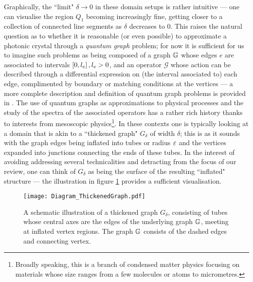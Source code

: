 Graphically, the ``limit" $\delta\rightarrow0$ in these domain setups is rather intuitive --- one can visualise the region $Q_1$ becoming increasingly fine, getting closer to a collection of connected line segments as $\delta$ decreases to 0.
This raises the natural question as to whether it is reasonable (or even possible) to approximate a photonic crystal through a \emph{quantum graph} problem; for now it is sufficient for us to imagine such problems as being composed of a graph $\mathbb{G}$ whose edges $e$ are associated to intervals $\left[ 0,l_{e} \right], l_{e}>0$, and an operator $\mathcal{G}$ whose action can be described through a differential expression on (the interval associated to) each edge, complimented by boundary or matching conditions at the vertices --- a more complete description and definition of quantum graph problems is provided in .
The use of quantum graphs as approximations to physical processes and the study of the spectra of the associated operators has a rather rich history thanks  to interests from mesoscopic physics\footnote{Broadly speaking, this is a branch of condensed matter physics focusing on materials whose size ranges from a few molecules or atoms to micrometres.}.
In these contexts one is typically looking at a domain that is akin to a ``thickened graph" $G_{\delta}$ of width $\delta$; this is as it sounds with the graph edges being inflated into tubes or radius $\varepsilon$ and the vertices expanded into junctions connecting the ends of these tubes.
In the interest of avoiding addressing several technicalities and detracting from the focus of our review, one can think of $G_{\delta}$ as being the surface of the resulting ``inflated" structure --- the illustration in figure \ref{fig:Diagram_ThickenedGraph} provides a sufficient visualisation.
\begin{figure}[b]
	\centering
	\texttt{[image: Diagram\_ThickenedGraph.pdf]}
	\caption{\label{fig:Diagram_ThickenedGraph} A schematic illustration of a thickened graph $G_{\delta}$, consisting of tubes whose central axes are the edges of the underlying graph $\mathbb{G}$, meeting at inflated vertex regions. The graph $\mathbb{G}$ consists of the dashed edges and connecting vertex.}
\end{figure}
